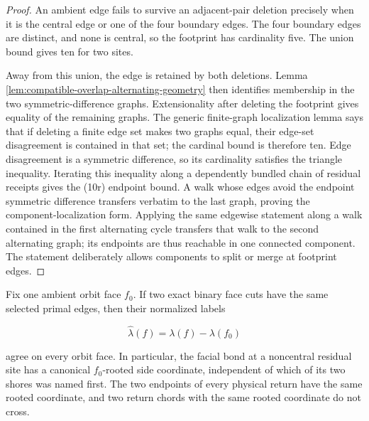 \begin{proof}
An ambient edge fails to survive an adjacent-pair deletion precisely when it
is the central edge or one of the four boundary edges.  The four boundary
edges are distinct, and none is central, so the footprint has cardinality
five.  The union bound gives ten for two sites.

Away from this union, the edge is retained by both deletions.  Lemma
\ref{lem:compatible-overlap-alternating-geometry} then identifies membership
in the two symmetric-difference graphs.  Extensionality after deleting the
footprint gives equality of the remaining graphs.  The generic finite-graph
localization lemma says that if deleting a finite edge set makes two graphs
equal, their edge-set disagreement is contained in that set; the cardinal
bound is therefore ten.  Edge disagreement is a symmetric difference, so its
cardinality satisfies the triangle inequality.  Iterating this inequality
along a dependently bundled chain of residual receipts gives the (10r)
endpoint bound.  A walk whose edges avoid the endpoint symmetric difference
transfers verbatim to the last graph, proving the component-localization
form.  Applying the same
edgewise statement along a walk contained in the first alternating cycle
transfers that walk to the second alternating graph; its endpoints are thus
reachable in one connected component.  The statement deliberately allows
components to split or merge at footprint edges.
\end{proof}

\begin{lemma}
\label{lem:rooted-residual-face-side-gauge}
Fix one ambient orbit face \(f_0\).  If two exact binary face cuts have the
same selected primal edges, then their normalized labels

\[
       \widehat\lambda(f)=\lambda(f)-\lambda(f_0)
\]

agree on every orbit face.  In particular, the facial bond at a noncentral
residual site has a canonical \(f_0\)-rooted side coordinate, independent of
which of its two shores was named first.  The two endpoints of every physical
return have the same rooted coordinate, and two return chords with the same
rooted coordinate do not cross.
\end{lemma}

